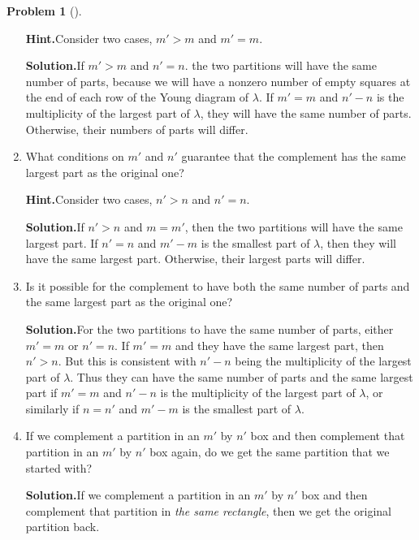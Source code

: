 \documentclass[10pt,]{book}
\theoremstyle{plain}
\theoremstyle{definition}
\newtheorem{activity}[project]{Problem}
\theoremstyle{definition}
\numberwithin{equation}{chapter}
\newcommand{\gt}{>}
\begin{document}
\begin{activity}[]
\begin{enumerate}[font=\bfseries,label=(\alph*),ref=\alph*]
\textbf{Hint.}\quad Consider two cases, \(m' \gt m\) and \(m' = m\).%
\par\medskip\noindent%
\textbf{Solution.}\quad If \(m'>m\) and \(n'=n\). the two partitions will have the same number of parts, because we will have a nonzero number of empty squares at the end of each row of the Young diagram of \(\lambda\). If \(m'=m\) and \(n'-n\) is the multiplicity of the largest part of \(\lambda\), they will have the same number of parts. Otherwise, their numbers of parts will differ.%
\item\label{task-116} What conditions on \(m'\) and \(n'\) guarantee that the complement has the same largest part as the original one?%
\par\medskip\noindent%
\textbf{Hint.}\quad Consider two cases, \(n' \gt n\) and \(n' = n\).%
\par\medskip\noindent%
\textbf{Solution.}\quad If \(n'\gt n\) and \(m=m'\), then the two partitions will have the same largest part. If \(n'=n\) and \(m'-m\) is the smallest part of \(\lambda\), then they will have the same largest part. Otherwise, their largest parts will differ.%
\item\label{task-117} Is it possible for the complement to have both the same number of parts and the same largest part as the original one?%
\par\medskip\noindent%
\textbf{Solution.}\quad For the two partitions to have the same number of parts, either \(m'=m\) or \(n'=n\). If \(m'=m\) and they have the same largest part, then \(n'>n\). But this is consistent with \(n'-n\) being the multiplicity of the largest part of \(\lambda\). Thus they can have the same number of parts and the same largest part if \(m'=m\) and \(n'-n\) is the multiplicity of the largest part of \(\lambda\), or similarly if \(n=n'\) and \(m'-m\) is the smallest part of \(\lambda\).%
\item\label{task-118} If we complement a partition in an \(m'\) by \(n'\) box and then complement that partition in an \(m'\) by \(n'\) box again, do we get the same partition that we started with?%
\par\medskip\noindent%
\textbf{Solution.}\quad If we complement a partition in an \(m'\) by \(n'\) box and then complement that partition in \emph{the same rectangle}, then we get the original partition back.%
\end{enumerate}
\end{activity}
\end{document}
